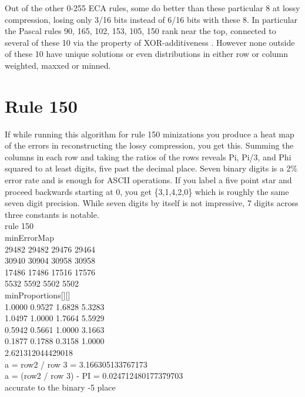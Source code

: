 \documentclass[11pt]{article}
\begin{document}
Out of the other 0-255 ECA rules, some do better than these particular 8 at lossy compression, losing only 3/16 bits instead of 6/16 bits with these 8. In particular the Pascal rules 90, 165, 102, 153, 105, 150 rank near the top, connected to several of these 10 via the property of XOR-additiveness \cite{xorAdditive}. However none outside of these 10 have unique solutions or even distributions in either row or column weighted, maxxed or minned.\\

\section{Rule 150}

If while running this algorithm for rule 150 minizations you produce a heat map of the errors in reconstructing the lossy compression, you get this. Summing the columns in each row and taking the ratios of the rows reveals Pi, Pi/3, and Phi squared to at least digits, five past the decimal place. Seven binary digits is a 2\% error rate and is enough for ASCII operations. If you label a five point star and proceed backwards starting at 0, you get \{3,1,4,2,0\} which is roughly the same seven digit precision. While seven digits by itself is not impressive, 7 digits across three constants is notable.\\

\noindent rule 150\\

\noindent minErrorMap\\
29482 29482 29476 29464 \\
30940 30904 30958 30958 \\
17486 17486 17516 17576 \\
5532 5592 5502 5502 \\

\noindent minProportions[][]\\
1.0000 0.9527 1.6828 5.3283 \\
1.0497 1.0000 1.7664 5.5929 \\
0.5942 0.5661 1.0000 3.1663 \\
0.1877 0.1788 0.3158 1.0000 \\
2.621312044429018\\

\noindent a = row2 / row 3 = 3.166305133767173\\
a = (row2 / row 3) - PI = 0.024712480177379703\\
accurate to the binary -5 place\\
\end{document}
